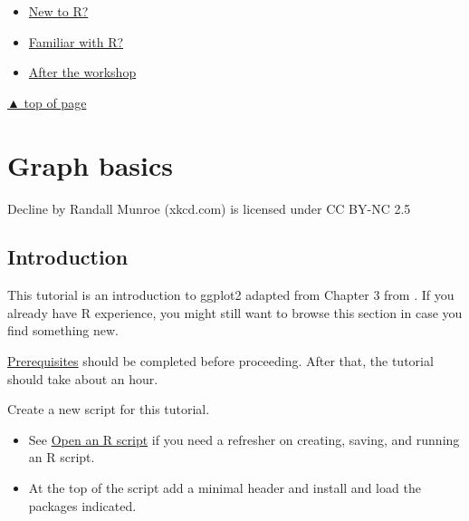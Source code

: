\documentclass[
]{book}
\providecommand{\tightlist}{%
  \setlength{\itemsep}{0pt}\setlength{\parskip}{0pt}}
\begin{document}
\begin{itemize}
\tightlist
\item
  \protect\hyperlink{new-to-r}{New to R?}\\
\item
  \protect\hyperlink{familiar-with-r}{Familiar with R?}\\
\item
  \protect\hyperlink{after-the-workshop}{After the workshop}
\end{itemize}

\protect\hyperlink{start-with-R}{▲ top of page}

\hypertarget{graph-basics}{%
\chapter{Graph basics}\label{graph-basics}}

Decline by Randall Munroe (xkcd.com) is licensed under CC BY-NC 2.5

\hypertarget{introduction-1}{%
\section{Introduction}\label{introduction-1}}

This tutorial is an introduction to ggplot2 adapted from Chapter 3 from \citep{Healy:2019}. If you already have R experience, you might still want to browse this section in case you find something new.

\protect\hyperlink{prerequisites}{Prerequisites} should be completed before proceeding. After that, the tutorial should take about an hour.

Create a new script for this tutorial.

\begin{itemize}
\tightlist
\item
  See \protect\hyperlink{open-an-r-script}{Open an R script} if you need a refresher on creating, saving, and running an R script.
\item
  At the top of the script add a minimal header and install and load the packages indicated.
\end{itemize}
\end{document}
